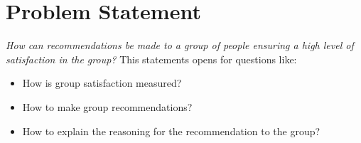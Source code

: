 \section{Problem Statement}
\textit{How can recommendations be made to a group of people ensuring a high level of satisfaction in the group?} This statements opens for questions like:
\begin{itemize}
\item How is group satisfaction measured?
\item How to make group recommendations?
\item How to explain the reasoning for the recommendation to the group?
\end{itemize}